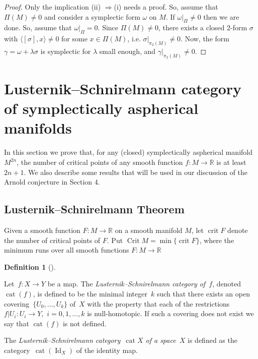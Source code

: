 \documentclass[12pt]{amsart}
\newcommand{\B}[1]{{\mathbb #1}}
\newcommand\R{\B R}
\numberwithin{equation}{section}
\theoremstyle{definition}
\newtheorem{definition}[subsection]{Definition}
\theoremstyle{remark}
\numberwithin{figure}{section}
\numberwithin{table}{section}
\newcommand{\ga}{{\gamma}}
\newcommand{\la}{{\lambda}}
\newcommand\id{\operatorname{Id}}
\newcommand\cat{\operatorname{cat}}
\newcommand\crit{\operatorname{crit}}
\newcommand\Crit{\operatorname{Crit}}
\def\la{\langle}
\def\ra{\rangle}
\begin{document}
  
 
\begin{proof} Only the implication (ii) $\Longrightarrow $(i) needs a proof.  
So, assume  
that $\Pi(M)\ne 0$ and consider a symplectic form $\omega$ on $M$. If 
$\omega|_{\Pi}\ne 0$ then we are done. So, assume that $\omega|_{\Pi}= 0$. Since 
$\Pi(M)\ne 0$,  
there exists a closed 2-form $\sigma$ with $\la[\sigma], x\ra \ne 0$ for some 
$x\in  
\Pi(M)$, i.e. $\sigma|_{\pi_2(M)}\ne 0$. Now, the form $\ga=\omega +  
\lambda\sigma$  
is symplectic for $\lambda$ small enough, and $\ga|_{\pi_2(M)}\ne 0$. 
\end{proof}  
 
\section{Lusternik--Schnirelmann category of symplectically aspherical  
manifolds} 
\label{S:LS} 
 
 
 
In this section we prove that, for any (closed) symplectically aspherical  
manifold $M^{2n}$, the number of critical points of any smooth function $f: M 
\to \R$ is  
at least $2n+1$. We also describe some results that will be used in our 
discussion of  
the Arnold conjecture in Section 4. 
 
 
 
\subsection{Lusternik--Schnirelmann Theorem} 
 
Given a smooth function $F: M \to \R$ on a smooth manifold $M$, let $\crit F$  
denote  
the number of critical points of $F$. Put $\Crit M=\min\{\crit F\}$, where the 
minimum   
runs  
over all smooth functions  $F: M \to \R$ 
 
 
 
\begin{definition}[\cite{Fox}] 
 
\label{def:cat-map} 
 
Let~$f: X \to Y$ be a map. The 
{\it Lusternik--Schnirelmann category of~$f$}, denoted~$\cat(f)$, is 
defined to be the minimal integer~$k$ such that there exists an open 
covering~$\{U_0, \ldots, U_k\}$ of~$X$ with the property that each of 
the restrictions~$f|U_i\colon U_i \to Y$,~$i=0,1, \ldots, k$ is 
null-homotopic. If such a covering does not exist we say that $\cat(f)$ is not  
defined. 
 
The {\it Lusternik--Schnirelmann category~$\cat X$ of a space~$X$} is 
defined as the category~$\cat (\id_X)$ of the identity map. 
\end{definition} 
 
\end{document}
